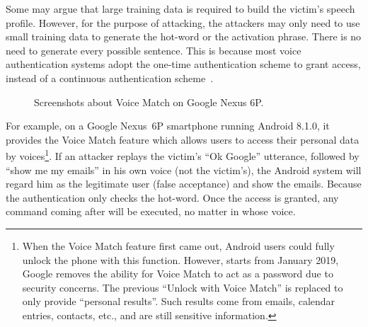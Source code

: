 Some may argue that large training data is required to build the victim's speech profile. However, for the purpose of attacking, the attackers may only need to use small training data to generate the hot-word or the activation phrase. There is no need to generate every possible sentence. This is because most voice authentication systems adopt the one-time authentication scheme to grant access, instead of a continuous authentication scheme~\cite{feng2017continuous}.

\begin{landscape}
	\begin{figure*}[h]
		\begin{minipage}[t]{0.33\textwidth}
			\label{fig:voicematch}
		\end{minipage}
		\hspace{1in}
		\begin{minipage}[t]{0.33\textwidth}
			\label{fig:voicematch2}
		\end{minipage}
		\hspace{1in}
		\begin{minipage}[t]{0.33\textwidth}
			\label{fig:email}
		\end{minipage} 
	\vspace{-.05in}
		\caption{Screenshots about Voice Match on Google Nexus 6P.}\label{fig:example}
	\end{figure*}
\end{landscape}

For example, on a Google Nexus~6P smartphone running Android 8.1.0, it provides the Voice Match feature which allows users to access their personal data by voices\footnote{When the Voice Match feature first came out, Android users could fully unlock the phone with this function. However, starts from January 2019, Google removes the ability for Voice Match to act as a password due to security concerns. The previous ``Unlock with Voice Match'' is replaced to only provide ``personal results''. Such results come from emails, calendar entries, contacts, etc., and are still sensitive information.}. If an attacker replays the victim's ``Ok Google'' utterance, followed by ``show me my emails'' in his own voice (not the victim's), the Android system will regard him as the legitimate user (false acceptance) and show the emails. Because the authentication only checks the hot-word. Once the access is granted, any command coming after will be executed, no matter in whose voice.


